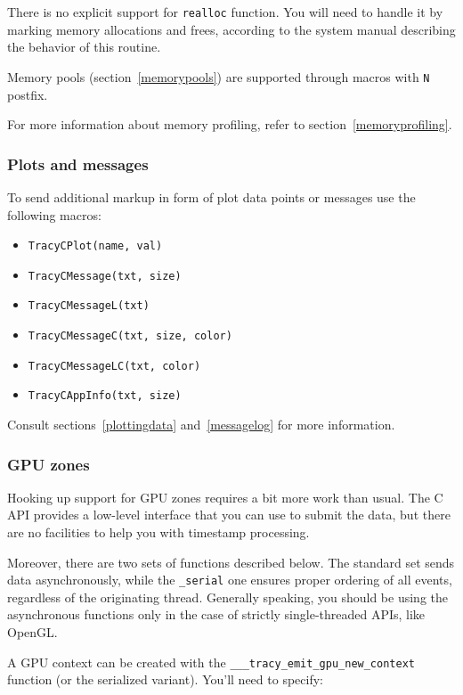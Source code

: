 \documentclass[hidelinks,titlepage,a4paper]{article}
\begin{document}
There is no explicit support for \texttt{realloc} function. You will need to handle it by marking memory allocations and frees, according to the system manual describing the behavior of this routine.

Memory pools (section~\ref{memorypools}) are supported through macros with \texttt{N} postfix.

For more information about memory profiling, refer to section~\ref{memoryprofiling}.

\subsubsection{Plots and messages}

To send additional markup in form of plot data points or messages use the following macros:

\begin{itemize}
\item \texttt{TracyCPlot(name, val)}
\item \texttt{TracyCMessage(txt, size)}
\item \texttt{TracyCMessageL(txt)}
\item \texttt{TracyCMessageC(txt, size, color)}
\item \texttt{TracyCMessageLC(txt, color)}
\item \texttt{TracyCAppInfo(txt, size)}
\end{itemize}

Consult sections~\ref{plottingdata} and~\ref{messagelog} for more information.

\subsubsection{GPU zones}

Hooking up support for GPU zones requires a bit more work than usual. The C API provides a low-level interface that you can use to submit the data, but there are no facilities to help you with timestamp processing.

Moreover, there are two sets of functions described below. The standard set sends data asynchronously, while the \texttt{\_serial} one ensures proper ordering of all events, regardless of the originating thread. Generally speaking, you should be using the asynchronous functions only in the case of strictly single-threaded APIs, like OpenGL.

A GPU context can be created with the \texttt{\_\_\_tracy\_emit\_gpu\_new\_context} function (or the serialized variant). You'll need to specify:
\end{document}
